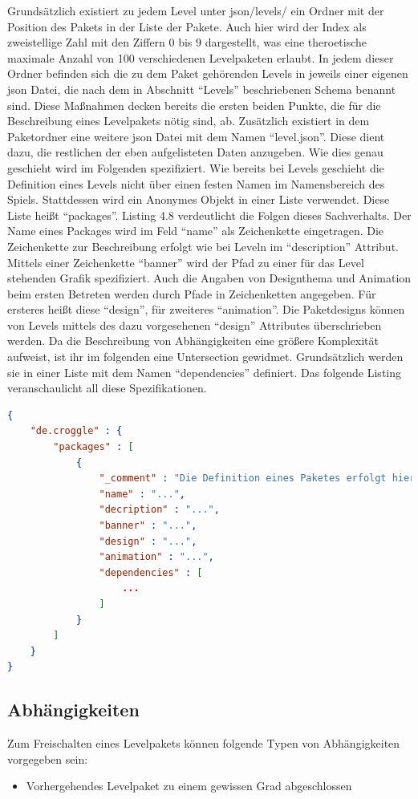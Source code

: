 Grundsätzlich existiert zu jedem Level unter json/levels/ ein Ordner mit der Position des Pakets in der Liste der Pakete.
Auch hier wird der Index als zweistellige Zahl mit den Ziffern 0 bis 9 dargestellt, was eine theroetische maximale Anzahl von 100 verschiedenen Levelpaketen erlaubt.
In jedem dieser Ordner befinden sich die zu dem Paket gehörenden Levels in jeweils einer eigenen json Datei, die nach dem in Abschnitt "`Levels"' beschriebenen Schema benannt sind.
Diese Maßnahmen decken bereits die ersten beiden Punkte, die für die Beschreibung eines Levelpakets nötig sind, ab.
Zusätzlich existiert in dem Paketordner eine weitere json Datei mit dem Namen "`level.json"'.
Diese dient dazu, die restlichen der eben aufgelisteten Daten anzugeben.
Wie dies genau geschieht wird im Folgenden spezifiziert.
\newline
Wie bereits bei Levels geschieht die Definition eines Levels nicht über einen festen Namen im Namensbereich des Spiels.
Stattdessen wird ein Anonymes Objekt in einer Liste verwendet.
Diese Liste heißt "`packages"'.
Listing 4.8 verdeutlicht die Folgen dieses Sachverhalts.
Der Name eines Packages wird im Feld "`name"' als Zeichenkette eingetragen.
Die Zeichenkette zur Beschreibung erfolgt wie bei Leveln im "`description"' Attribut.
Mittels einer Zeichenkette "`banner"' wird der Pfad zu einer für das Level stehenden Grafik spezifiziert.
Auch die Angaben von Designthema und Animation beim ersten Betreten werden durch Pfade in Zeichenketten angegeben.
Für ersteres heißt diese "`design"', für zweiteres "`animation"'.
Die Paketdesigns können von Levels mittels des dazu vorgesehenen "`design"' Attributes überschrieben werden.
Da die Beschreibung von Abhängigkeiten eine größere Komplexität aufweist, ist ihr im folgenden eine Untersection gewidmet.
Grundsätzlich werden sie in einer Liste mit dem Namen "`dependencies"' definiert.
Das folgende Listing veranschaulicht all diese Spezifikationen.
\begin{lstlisting}[language=json,caption={Standardinhalt der Definition eines Levels}]
{
	"de.croggle" : {
		"packages" : [
			{
				"_comment" : "Die Definition eines Paketes erfolgt hier",
				"name" : "...",
				"decription" : "...",
				"banner" : "...",
				"design" : "...",
				"animation" : "...",
				"dependencies" : [
					...
				]
			}
		]
	}
}
\end{lstlisting}

\subsection{Abhängigkeiten}
Zum Freischalten eines Levelpakets können folgende Typen von Abhängigkeiten vorgegeben sein:
\begin{itemize}
	\item Vorhergehendes Levelpaket zu einem gewissen Grad abgeschlossen
\end{itemize}

